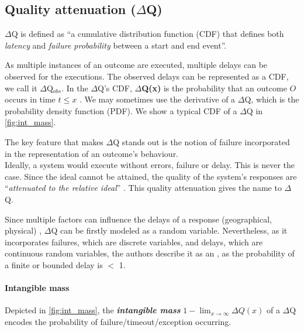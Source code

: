 \subsection{Quality attenuation ($\Delta$Q)}
    $\Delta$Q is defined as ``a cumulative distribution function (CDF) that defines both \textit{latency} and \textit{failure probability} between a start and end event''. \cite{dq-tut}
    
        As multiple instances of an outcome are executed, multiple delays can be observed for the executions. The observed delays can be represented as a CDF, we call it $\Delta$Q$_{obs}$. In the $\Delta$Q's CDF, \textbf{$\Delta$Q(x)} is the probability that an outcome $O$ occurs in time $t \le x$ \cite{art}.  We may sometimes use the derivative of a $\Delta$Q, which is the probability density function (PDF). We show a typical CDF of a $\Delta$Q in \cref{fig:int_mass}.

    The key feature that makes $\Delta$Q stands out is the notion of failure incorporated in the representation of an outcome's behaviour. \\
 Ideally, a system would execute without errors, failure or delay. This is never the case. Since the ideal cannot be attained, the quality of the system's responses are ``\textit{attenuated to the relative ideal}''  \cite{myo}. This quality attenuation gives the name to $\Delta$Q.

    Since multiple factors can influence the delays of a response (geographical, physical) \cite{dq-tut}, $\Delta$Q can be firstly modeled as a random variable. Nevertheless, as it incorporates failures, which are discrete variables, and delays, which are continuous random variables, the authors describe it as an , as the probability of a finite or bounded delay is $<$ 1. \cite{myo}
   
    \paragraph{Intangible mass} Depicted in \cref{fig:int_mass}, the \textbf{\textit{intangible mass}} $1 - \lim_{x\to\infty}\Delta Q(x)$ of a $\Delta$Q encodes the probability of failure/timeout/exception occurring. \cite{art}\label{int_mass}
        
